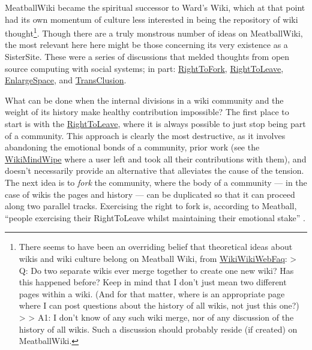 \documentclass[10pt]{article}
\begin{document}
\begin{multicols}{2}
MeatballWiki became the spiritual successor to Ward's Wiki, which at
that point had its own momentum of culture less interested in being the
repository of wiki thought\footnote{There seems to have been an
  overriding belief that theoretical ideas about wikis and wiki culture
  belong on Meatball Wiki, from
  \href{http://wiki.c2.com/?WikiWikiWebFaq}{WikiWikiWebFaq}:
  \textgreater{} Q: Do two separate wikis ever merge together to create
  one new wiki? Has this happened before? Keep in mind that I don't just
  mean two different pages within a wiki. (And for that matter, where is
  an appropriate page where I can post questions about the history of
  all wikis, not just this one?) \textgreater{} \textgreater{} A1: I
  don't know of any such wiki merge, nor of any discussion of the
  history of all wikis. Such a discussion should probably reside (if
  created) on MeatballWiki.}. Though there are a truly monstrous number
of ideas on MeatballWiki, the most relevant here here might be those
concerning its very existence as a SisterSite. These were a series of
discussions that melded thoughts from open source computing with social
systems; in part:
\href{http://meatballwiki.org/wiki/RightToFork}{RightToFork},
\href{http://meatballwiki.org/wiki/RightToLeave}{RightToLeave},
\href{http://meatballwiki.org/wiki/EnlargeSpace}{EnlargeSpace}, and
\href{http://meatballwiki.org/wiki/TransClusion}{TransClusion}.

What can be done when the internal divisions in a wiki community and the
weight of its history make healthy contribution impossible? The first
place to start is with the
\href{http://meatballwiki.org/wiki/RightToLeave}{RightToLeave}, where it
is always possible to just stop being part of a community. This approach
is clearly the most destructive, as it involves abandoning the emotional
bonds of a community, prior work (see the
\href{http://wiki.c2.com/?WikiMindWipe}{WikiMindWipe} where a user left
and took all their contributions with them), and doesn't necessarily
provide an alternative that alleviates the cause of the tension. The
next idea is to \emph{fork} the community, where the body of a community
--- in the case of wikis the pages and history --- can be duplicated so
that it can proceed along two parallel tracks. Exercising the right to
fork is, according to Meatball, ``people exercising their RightToLeave
whilst maintaining their emotional stake'' \cite{MeatballWikiRightToLeave} .


\end{multicols}
\end{document}
